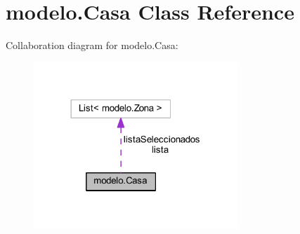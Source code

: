 \hypertarget{classmodelo_1_1_casa}{}\section{modelo.\+Casa Class Reference}
\label{classmodelo_1_1_casa}


Collaboration diagram for modelo.\+Casa\+:
\nopagebreak
\begin{figure}[H]
\begin{center}
\leavevmode
\includegraphics[width=218pt]{classmodelo_1_1_casa__coll__graph}
\end{center}
\end{figure}
